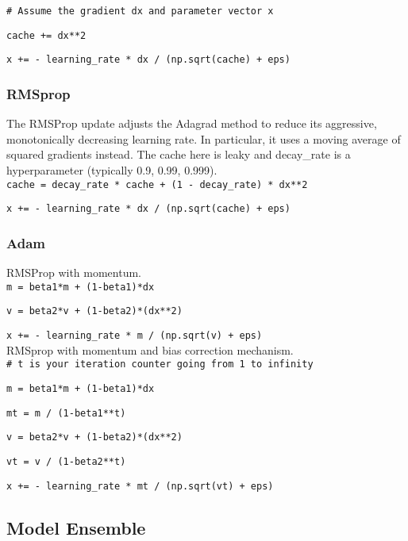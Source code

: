 \documentclass[letterpaper]{article}
\begin{document}
\texttt{\# Assume the gradient dx and parameter vector x}

\texttt{cache += dx**2}

\texttt{x += - learning\_rate * dx / (np.sqrt(cache) + eps)}

\subsubsection{RMSprop}

The RMSProp update adjusts the Adagrad method to reduce its aggressive, monotonically decreasing learning rate. In particular, it uses a moving average of squared gradients instead. The cache here is leaky and decay\_rate is a hyperparameter (typically 0.9, 0.99, 0.999).\\

\texttt{cache = decay\_rate * cache + (1 - decay\_rate) * dx**2}

\texttt{x += - learning\_rate * dx / (np.sqrt(cache) + eps)}

\subsubsection{Adam}

RMSProp with momentum.\\

\texttt{m = beta1*m + (1-beta1)*dx}

\texttt{v = beta2*v + (1-beta2)*(dx**2)}

\texttt{x += - learning\_rate * m / (np.sqrt(v) + eps)}\\

\noindent RMSprop with momentum and bias correction mechanism.\\

\texttt{\# t is your iteration counter going from 1 to infinity}

\texttt{m = beta1*m + (1-beta1)*dx}

\texttt{mt = m / (1-beta1**t)}

\texttt{v = beta2*v + (1-beta2)*(dx**2)}

\texttt{vt = v / (1-beta2**t)}

\texttt{x += - learning\_rate * mt / (np.sqrt(vt) + eps)}\\

\subsection{Model Ensemble}
\end{document}
